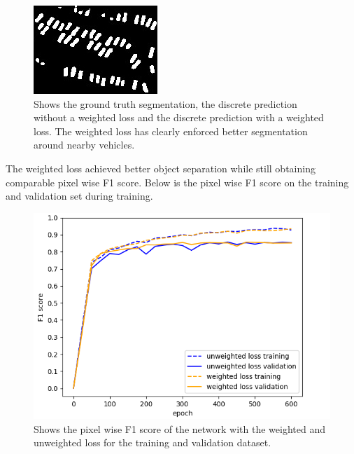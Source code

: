 \documentclass{kththesis}
\begin{document}
\begin{figure}[H]
\endminipage\hfill
{}%
  \includegraphics[width=\linewidth]{class_vs_w/weight_2}
\endminipage
\caption{Shows the ground truth segmentation, the discrete prediction without a weighted loss and the discrete prediction with a weighted loss. The weighted loss has clearly enforced better segmentation around nearby vehicles.}
\end{figure}
\noindent The weighted loss achieved better object separation while still obtaining comparable pixel wise F1 score. Below is the pixel wise F1 score on the training and validation set during training.
\begin{figure}[H]
\centering
      \includegraphics[scale=0.5]{weighted_vs_unweighted}
  \caption{Shows the pixel wise F1 score of the network with the weighted and unweighted loss for the training and validation dataset.} \label{fig:weighted_vs_unweighted}
\end{figure}
\end{document}
